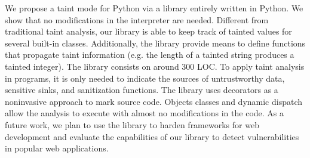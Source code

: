 \documentclass[oribibl]{llncs}
\begin{document}
We propose a taint mode for Python via a library entirely written
in Python.
We show that no modifications in the interpreter are needed. 
Different from traditional taint analysis, our library
is able to 
keep track of tainted values for  
several built-in classes.
Additionally, the library provide means to define functions that 
propagate taint information
(e.g. the length of a tainted string produces a
tainted integer). The library consists on around 300 LOC.
To apply taint analysis in programs, it is only needed 
to indicate the sources of untrustworthy data, sensitive 
sinks, and sanitization functions. The library uses decorators 
as a noninvasive approach to mark source code. 
Objects classes 
and dynamic dispatch allow the analysis to execute with almost no modifications
in the  code. %
As a future work, we plan to use the library to harden frameworks
for web development and evaluate the capabilities of our library to 
detect vulnerabilities
in popular web applications.



{\small{


}}
\end{document}
